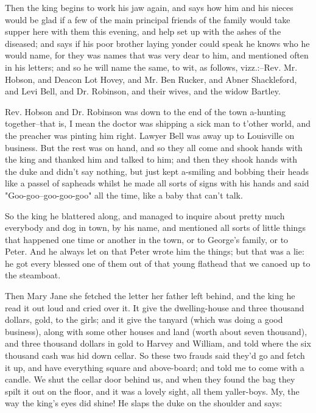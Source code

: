 Then the king begins to work his jaw again, and says how him and his
nieces would be glad if a few of the main principal friends of the family
would take supper here with them this evening, and help set up with the
ashes of the diseased; and says if his poor brother laying yonder could
speak he knows who he would name, for they was names that was very dear
to him, and mentioned often in his letters; and so he will name the same,
to wit, as follows, vizz.:--Rev. Mr. Hobson, and Deacon Lot Hovey, and
Mr. Ben Rucker, and Abner Shackleford, and Levi Bell, and Dr. Robinson,
and their wives, and the widow Bartley.

Rev. Hobson and Dr. Robinson was down to the end of the town a-hunting
together--that is, I mean the doctor was shipping a sick man to t'other
world, and the preacher was pinting him right.  Lawyer Bell was away up
to Louisville on business.  But the rest was on hand, and so they all
come and shook hands with the king and thanked him and talked to him; and
then they shook hands with the duke and didn't say nothing, but just kept
a-smiling and bobbing their heads like a passel of sapheads whilst he
made all sorts of signs with his hands and said "Goo-goo--goo-goo-goo"
all the time, like a baby that can't talk.

So the king he blattered along, and managed to inquire about pretty much
everybody and dog in town, by his name, and mentioned all sorts of little
things that happened one time or another in the town, or to George's
family, or to Peter.  And he always let on that Peter wrote him the
things; but that was a lie:  he got every blessed one of them out of that
young flathead that we canoed up to the steamboat.

Then Mary Jane she fetched the letter her father left behind, and the
king he read it out loud and cried over it.  It give the dwelling-house
and three thousand dollars, gold, to the girls; and it give the tanyard
(which was doing a good business), along with some other houses and land
(worth about seven thousand), and three thousand dollars in gold to
Harvey and William, and told where the six thousand cash was hid down
cellar.  So these two frauds said they'd go and fetch it up, and have
everything square and above-board; and told me to come with a candle.  We
shut the cellar door behind us, and when they found the bag they spilt it
out on the floor, and it was a lovely sight, all them yaller-boys.  My,
the way the king's eyes did shine!  He slaps the duke on the shoulder and
says:


